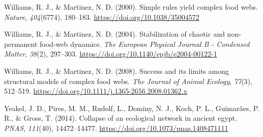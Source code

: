 \documentclass[
]{article}
\newlength{\cslhangindent}
\newenvironment{CSLReferences}[2] %
 {\begin{list}{}{%
  \setlength{\itemindent}{0pt}
  \setlength{\leftmargin}{0pt}
  \setlength{\parsep}{0pt}
  \ifodd #1
   \setlength{\leftmargin}{\cslhangindent}
   \setlength{\itemindent}{-1\cslhangindent}
  \fi
  \setlength{\itemsep}{#2\baselineskip}}}
 {\end{list}}
\begin{document}
\begin{CSLReferences}{1}{0}
Williams, R. J., \& Martinez, N. D. (2000). Simple rules yield complex
food webs. \emph{Nature}, \emph{404}(6774), 180--183.
\url{https://doi.org/10.1038/35004572}

Williams, R. J., \& Martinez, N. D. (2004). Stabilization of chaotic and
non-permanent food-web dynamics. \emph{The European Physical Journal B -
Condensed Matter}, \emph{38}(2), 297--303.
\url{https://doi.org/10.1140/epjb/e2004-00122-1}

Williams, R. J., \& Martinez, N. D. (2008). Success and its limits among
structural models of complex food webs. \emph{The Journal of Animal
Ecology}, \emph{77}(3), 512--519.
\url{https://doi.org/10.1111/j.1365-2656.2008.01362.x}

Yeakel, J. D., Pires, M. M., Rudolf, L., Dominy, N. J., Koch, P. L.,
Guimarães, P. R., \& Gross, T. (2014). Collapse of an ecological network
in ancient egypt. \emph{PNAS}, \emph{111}(40), 14472--14477.
\url{https://doi.org/10.1073/pnas.1408471111}

\end{CSLReferences}
\end{document}

